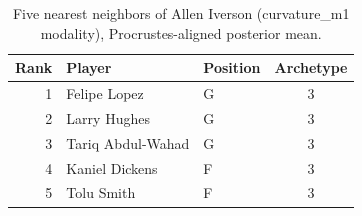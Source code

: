 \begin{table}[htbp]
  \centering\small
  \begin{tabular}{rllc}
    \toprule
    Rank & Player & Position & Archetype \\
    \midrule
    1 & Felipe Lopez & G & 3 \\
    2 & Larry Hughes & G & 3 \\
    3 & Tariq Abdul-Wahad & G & 3 \\
    4 & Kaniel Dickens & F & 3 \\
    5 & Tolu Smith & F & 3 \\
    \bottomrule
  \end{tabular}
  \caption{Five nearest neighbors of Allen Iverson (curvature_m1 modality), Procrustes-aligned posterior mean.}
  \label{tab:Allen_Iverson_neighbors_curvature_m1}
\end{table}

